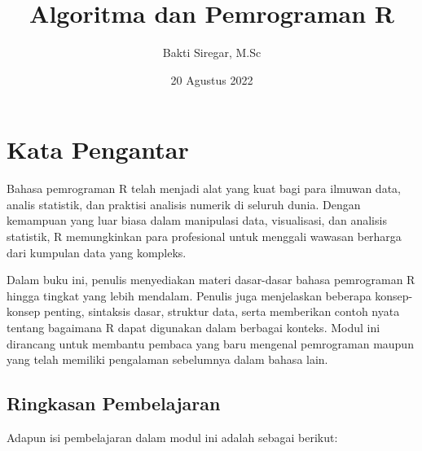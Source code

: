 \documentclass[
]{book}
\title{Algoritma dan Pemrograman R}
\author{Bakti Siregar, M.Sc}
\date{20 Agustus 2022}
\begin{document}
\maketitle

{
\setcounter{tocdepth}{1}
\tableofcontents
}
\hypertarget{kata-pengantar}{%
\chapter*{Kata Pengantar}\label{kata-pengantar}}

Bahasa pemrograman R telah menjadi alat yang kuat bagi para ilmuwan data, analis statistik, dan praktisi analisis numerik di seluruh dunia. Dengan kemampuan yang luar biasa dalam manipulasi data, visualisasi, dan analisis statistik, R memungkinkan para profesional untuk menggali wawasan berharga dari kumpulan data yang kompleks.

Dalam buku ini, penulis menyediakan materi dasar-dasar bahasa pemrograman R hingga tingkat yang lebih mendalam. Penulis juga menjelaskan beberapa konsep-konsep penting, sintaksis dasar, struktur data, serta memberikan contoh nyata tentang bagaimana R dapat digunakan dalam berbagai konteks. Modul ini dirancang untuk membantu pembaca yang baru mengenal pemrograman maupun yang telah memiliki pengalaman sebelumnya dalam bahasa lain.

\hypertarget{ringkasan-pembelajaran}{%
\section*{Ringkasan Pembelajaran}\label{ringkasan-pembelajaran}}

Adapun isi pembelajaran dalam modul ini adalah sebagai berikut:
\end{document}
